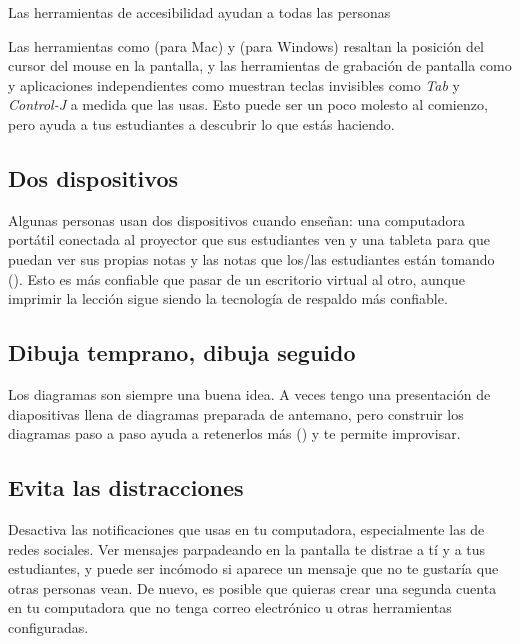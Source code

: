 \begin{aside}{Las herramientas de accesibilidad ayudan a todas las personas}

  Las herramientas como  (para Mac)
  y  (para Windows)
  resaltan la posición del cursor del mouse en la pantalla,
  y las herramientas de grabación de pantalla como 
  y aplicaciones independientes como 
  muestran teclas invisibles como \emph{Tab} y \emph{Control-J} a medida que las usas.
  Esto puede ser un poco molesto al comienzo,
  pero ayuda a tus estudiantes a descubrir lo que estás haciendo.
\end{aside}

\subsection*{Dos dispositivos}

Algunas personas usan dos dispositivos cuando enseñan:
una computadora portátil conectada al proyector que sus estudiantes ven
y una tableta para que puedan ver sus propias notas y las notas que los/las estudiantes están tomando ().
Esto es más confiable que pasar de un escritorio virtual al otro,
aunque imprimir la lección sigue siendo la tecnología de respaldo más confiable.

\subsection*{Dibuja temprano, dibuja seguido}

Los diagramas son siempre una buena idea.
A veces tengo una presentación de diapositivas llena de diagramas preparada de antemano,
pero construir los diagramas paso a paso ayuda a retenerlos más ()
y te permite improvisar.

\subsection*{Evita las distracciones}

Desactiva las notificaciones que usas en tu computadora,
especialmente las de redes sociales.
Ver mensajes parpadeando en la pantalla te distrae a tí y a tus estudiantes,
y puede ser incómodo si aparece un mensaje que no te gustaría que otras personas vean.
De nuevo,
es posible que quieras crear una segunda cuenta en tu computadora que no tenga correo electrónico u otras herramientas configuradas.

